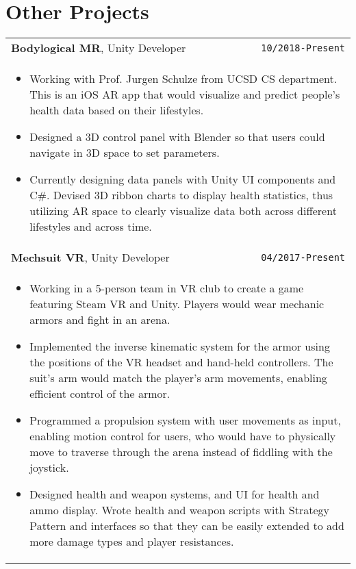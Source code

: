 \documentclass[10pt, letterpaper]{article}
\begin{document}
\section{Other Projects}
\smallskip
\noindent
\begin{tabularx}{\linewidth}{X r}
	\textbf{\large Bodylogical MR}, Unity Developer & \texttt{10/2018-Present} \\
	\multicolumn{2}{p{\linewidth}}{
		\begin{itemize}
			\item Working with Prof. Jurgen Schulze from UCSD CS department. This is an iOS AR app that would visualize and predict people's health data based on their lifestyles. 
			\item Designed a 3D control panel with Blender so that users could navigate in 3D space to set parameters.
			\item Currently designing data panels with Unity UI components and C\#. Devised 3D ribbon charts to display health statistics, thus utilizing AR space to clearly visualize data both across different lifestyles and across time.
		\end{itemize}
	} \\
	
	\textbf{\large Mechsuit VR}, Unity Developer & \texttt{04/2017-Present} \\
	\multicolumn{2}{p{\linewidth}}{
		\begin{itemize}
			\item Working in a 5-person team in VR club to create a game featuring Steam VR and Unity. Players would wear mechanic armors and fight in an arena.
			\item Implemented the inverse kinematic system for the armor using the positions of the VR headset and hand-held controllers. The suit's arm would match the player's arm movements, enabling efficient control of the armor.
			\item Programmed a propulsion system with user movements as input, enabling motion control for users, who would have to physically move to traverse through the arena instead of fiddling with the joystick. 
			\item Designed health and weapon systems, and UI for health and ammo display. Wrote health and weapon scripts with Strategy Pattern and interfaces so that they can be easily extended to add more damage types and player resistances.
		\end{itemize}
	} \\
	

\end{tabularx}
\end{document}
